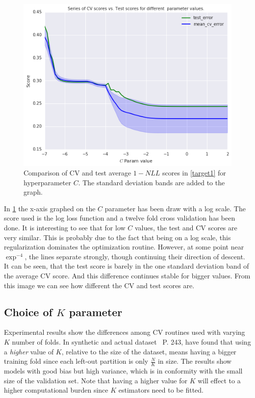 \begin{figure}[h!]
\begin{center}
\includegraphics[width=0.7\columnwidth]{figures/cross_validation/train_and_cv_score_comparison_logreg.jpg}
\caption{ Comparison of CV and test average $1-NLL$ scores in \cref{target1} for hyperparameter $C$. The standard deviation bands are added to the graph.}
\label{fig:cv_vs_test_score}
\end{center}
\end{figure}

In \cref{fig:cv_vs_test_score} the x-axis graphed on the $C$ parameter has been draw with a log scale.
The score used is the log loss function and a twelve fold cross validation has been done.
It is interesting to see that for low $C$ values, the test and CV scores are very similar.
This is probably due to the fact that being on a log scale, this regularization dominates the optimization routine.
However, at some point near $\exp^{-4}$, the lines separate strongly, though continuing their direction of descent.
It can be seen, that the test score is barely in the one standard deviation band of the average CV score.
And this difference continues stable for bigger values.
From this image we can see how different the CV and test scores are.

\subsection{Choice of \texorpdfstring{$K$ parameter}{Lg} }

 Experimental results show the differences among CV routines used with varying $K$ number of folds.
In synthetic and actual dataset~\textcite{hastie-elemstatslearn} P.
243, have found that using a \textit{higher} value of $K$, relative to the size of the dataset, means having a bigger training fold since each left-out partition is only $\frac{N}{K}$ in size.
The results show models with good bias but high variance, which is in conformity with the small size of the validation set.
Note that having a higher value for $K$ will effect to a higher computational burden since $K$ estimators need to be fitted.

